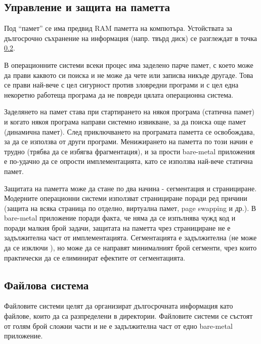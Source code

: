   \subsection{Управление и защита на паметта}
  Под ``памет'' се има предвид RAM паметта на компютъра. Устойствата за дългосрочно съхранение на информация (напр. твърд диск) се разглеждат в точка \ref{filesystems}.

  В операционните системи всеки процес има заделено парче памет, с което може да прави каквото си поиска и не може да чете или записва никъде другаде. Това се прави най-вече с цел сигурност против зловредни програми и с цел една некоретно работеща програма да не повреди цялата операционна система.

  Заделянето на памет става при стартирането на някоя програма (статична памет) и когато някоя програма направи системно извикване, за да поиска още памет (динамична памет). След приключването на програмата паметта се освобождава, за да се използва от други програми. Менижирането на паметта по този начин е трудно (трябва да се избягва фрагментация), и за прости bare-metal приложения е по-удачно да се опрости имплементацията, като се използва най-вече статична памет.

  Защитата на паметта може да стане по два начина - сегментация и странициране. Модерните операционни системи използват странициране поради ред причини (защита на всяка страница по отделно, виртуална памет, page swapping и др.).
  В bare-metal приложение поради факта, че няма да се изпълнява чужд код и поради малкия брой задачи, защитата на паметта чрез странициране не е задължителна част от имплементацията. Сегментацията е задължителна (не може да се изключи \cite[глава~4]{amd-manual}), но може да се направят минималният брой сегменти, чрез които практически да се елиминират ефектите от сегментацията.

  \subsection{Файлова система} \label{filesystems}
  Файловите системи целят да организират дългосрочната информация като файлове, които да са разпределени в директории. Файловите системи се състоят от голям брой сложни части и не е задължителна част от едно bare-metal приложение.

